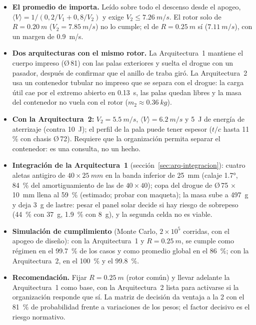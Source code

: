 \begin{resultado}
\begin{itemize}
  \item \textbf{El promedio de  importa.} Leído sobre todo el descenso desde el
        apogeo, $\langle V\rangle=1/(0{,}2/V_1+0{,}8/V_2)$ y exige $V_2\le\SI{7.26}{m/s}$. El
        rotor solo de $R=\SI{0.20}{m}$ ($V_2=\SI{7.85}{m/s}$) no lo cumple; el de
        $R=\SI{0.25}{m}$ sí ($\SI{7.11}{m/s}$), con un margen de \SI{0.9}{m/s}.
  \item \textbf{Dos arquitecturas con el mismo rotor.} La Arquitectura~1 mantiene el cuerpo
        impreso (Ø\,81) con las palas exteriores y suelta el drogue con un pasador, después de
        confirmar que el anillo de traba giró. La Arquitectura~2 usa un contenedor tubular no
        impreso que se separa con el drogue: la carga útil cae por el extremo abierto en
        \SI{0.13}{s}, las palas quedan libres y la masa del contenedor no vuela con el
        rotor ($m_2\approx\SI{0.36}{kg}$).
  \item \textbf{Con la Arquitectura~2:} $V_2=\SI{5.5}{m/s}$, $\langle V\rangle=\SI{6.2}{m/s}$ y
        \SI{5}{J} de energía de aterrizaje (contra \SI{10}{J}); el perfil de la pala puede
        tener espesor ($t/c$ hasta 11\,\% con chasis Ø\,72). Requiere que la organización
        permita separar el contenedor: es una consulta, no un hecho.
  \item \textbf{Integración de la Arquitectura~1} (sección~\ref{sec:arq-integracion}): cuatro aletas
        antigiro de $40\times\SI{25}{mm}$ en la banda inferior de \SI{25}{mm} (calaje \ang{1.7},
        \SI{84}{\percent} del amortiguamiento de las de $40\times40$); copa del drogue de
        Ø\,75 $\times$ \SI{10}{mm} llena al \SI{59}{\percent} (estimado; probar con maqueta); la masa
        sube a \SI{497}{g} y deja \SI{3}{g} de lastre: pesar el panel solar decide si hay riesgo de
        sobrepeso (\SI{44}{\percent} con \SI{37}{g}, \SI{1.9}{\percent} con \SI{8}{g}), y la segunda celda no es viable.
  \item \textbf{Simulación de cumplimiento} (Monte Carlo, $2\times10^5$ corridas, con el apogeo
        de diseño): con la Arquitectura~1 y $R=\SI{0.25}{m}$,  se cumple como régimen en el
        \SI{99.7}{\percent} de los casos y como promedio global en el \SI{86}{\percent};
        con la Arquitectura~2, en el \SI{100}{\percent} y el \SI{99.8}{\percent}.
  \item \textbf{Recomendación.} Fijar $R=\SI{0.25}{m}$ (rotor común) y llevar adelante la
        Arquitectura~1 como base, con la Arquitectura~2 lista para activarse si la organización
        responde que sí. La matriz de decisión da ventaja a la 2 con el \SI{81}{\percent} de
        probabilidad frente a variaciones de los pesos; el factor decisivo es el riesgo
        normativo.
\end{itemize}
\end{resultado}

